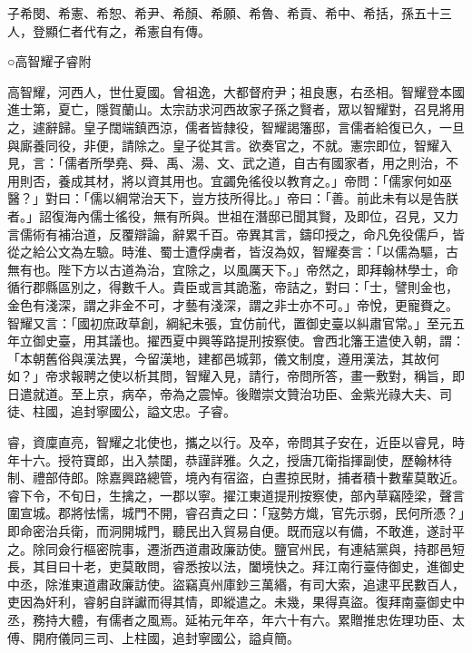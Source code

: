 \begin{pinyinscope}
 子希閔、希憲、希恕、希尹、希顏、希願、希魯、希貢、希中、希括，孫五十三人，登顯仁者代有之，希憲自有傳。



 ○高智耀子睿附



 高智耀，河西人，世仕夏國。曾祖逸，大都督府尹；祖良惠，右丞相。智耀登本國進士第，夏亡，隱賀蘭山。太宗訪求河西故家子孫之賢者，眾以智耀對，召見將用之，遽辭歸。皇子闊端鎮西涼，儒者皆隸役，智耀謁籓邸，言儒者給復已久，一旦與廝養同役，非便，請除之。皇子從其言。欲奏官之，不就。憲宗即位，智耀入見，言：「儒者所學堯、舜、禹、湯、文、武之道，自古有國家者，用之則治，不用則否，養成其材，將以資其用也。宜蠲免徭役以教育之。」帝問：「儒家何如巫醫？」對曰：「儒以綱常治天下，豈方技所得比。」帝曰：「善。前此未有以是告朕者。」詔復海內儒士徭役，無有所與。世祖在潛邸已聞其賢，及即位，召見，又力言儒術有補治道，反覆辯論，辭累千百。帝異其言，鑄印授之，命凡免役儒戶，皆從之給公文為左驗。時淮、蜀士遭俘虜者，皆沒為奴，智耀奏言：「以儒為驅，古無有也。陛下方以古道為治，宜除之，以風厲天下。」帝然之，即拜翰林學士，命循行郡縣區別之，得數千人。貴臣或言其詭濫，帝詰之，對曰：「士，譬則金也，金色有淺深，謂之非金不可，才藝有淺深，謂之非士亦不可。」帝悅，更寵賚之。智耀又言：「國初庶政草創，綱紀未張，宜仿前代，置御史臺以糾肅官常。」至元五年立御史臺，用其議也。擢西夏中興等路提刑按察使。會西北籓王遣使入朝，謂：「本朝舊俗與漢法異，今留漢地，建都邑城郭，儀文制度，遵用漢法，其故何如？」帝求報聘之使以析其問，智耀入見，請行，帝問所答，畫一敷對，稱旨，即日遣就道。至上京，病卒，帝為之震悼。後贈崇文贊治功臣、金紫光祿大夫、司徒、柱國，追封寧國公，謚文忠。子睿。



 睿，資廩直亮，智耀之北使也，攜之以行。及卒，帝問其子安在，近臣以睿見，時年十六。授符寶郎，出入禁闥，恭謹詳雅。久之，授唐兀衛指揮副使，歷翰林待制、禮部侍郎。除嘉興路總管，境內有宿盜，白晝掠民財，捕者積十數輩莫敢近。睿下令，不旬日，生擒之，一郡以寧。擢江東道提刑按察使，部內草竊陸梁，聲言圍宣城。郡將怯懦，城門不開，睿召責之曰：「寇勢方熾，官先示弱，民何所憑？」即命密治兵衛，而洞開城門，聽民出入貿易自便。既而寇以有備，不敢進，遂討平之。除同僉行樞密院事，遷浙西道肅政廉訪使。鹽官州民，有連結黨與，持郡邑短長，其目曰十老，吏莫敢問，睿悉按以法，闔境快之。拜江南行臺侍御史，進御史中丞，除淮東道肅政廉訪使。盜竊真州庫鈔三萬緡，有司大索，追逮平民數百人，吏因為奸利，睿躬自詳讞而得其情，即縱遣之。未幾，果得真盜。復拜南臺御史中丞，務持大體，有儒者之風焉。延祐元年卒，年六十有六。累贈推忠佐理功臣、太傅、開府儀同三司、上柱國，追封寧國公，謚貞簡。




\end{pinyinscope}
